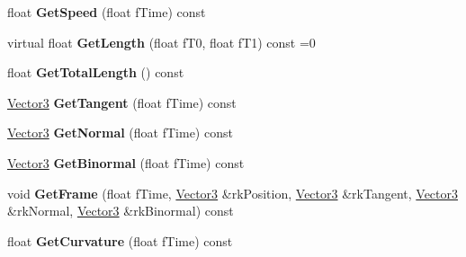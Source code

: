 \begin{DoxyCompactItemize}
\item 
float {\bfseries Get\+Speed} (float f\+Time) const \hypertarget{class_magnum_1_1_curve3_af4ba0fae1e8c996dc435f2b416fe9c7a}{}\label{class_magnum_1_1_curve3_af4ba0fae1e8c996dc435f2b416fe9c7a}

\item 
virtual float {\bfseries Get\+Length} (float f\+T0, float f\+T1) const  =0\hypertarget{class_magnum_1_1_curve3_afe03ce348cdfc71e86739bb19c6f7e57}{}\label{class_magnum_1_1_curve3_afe03ce348cdfc71e86739bb19c6f7e57}

\item 
float {\bfseries Get\+Total\+Length} () const \hypertarget{class_magnum_1_1_curve3_ac59357d48edc8fee6e96362cb49e2346}{}\label{class_magnum_1_1_curve3_ac59357d48edc8fee6e96362cb49e2346}

\item 
\hyperlink{class_magnum_1_1_vector3}{Vector3} {\bfseries Get\+Tangent} (float f\+Time) const \hypertarget{class_magnum_1_1_curve3_ada57700698b9ce31b161416e5b954ca4}{}\label{class_magnum_1_1_curve3_ada57700698b9ce31b161416e5b954ca4}

\item 
\hyperlink{class_magnum_1_1_vector3}{Vector3} {\bfseries Get\+Normal} (float f\+Time) const \hypertarget{class_magnum_1_1_curve3_aa3bcf0990ac54a48fd08c09dedcff489}{}\label{class_magnum_1_1_curve3_aa3bcf0990ac54a48fd08c09dedcff489}

\item 
\hyperlink{class_magnum_1_1_vector3}{Vector3} {\bfseries Get\+Binormal} (float f\+Time) const \hypertarget{class_magnum_1_1_curve3_a8f4ede1777a8e4f059873b6a7147a53f}{}\label{class_magnum_1_1_curve3_a8f4ede1777a8e4f059873b6a7147a53f}

\item 
void {\bfseries Get\+Frame} (float f\+Time, \hyperlink{class_magnum_1_1_vector3}{Vector3} \&rk\+Position, \hyperlink{class_magnum_1_1_vector3}{Vector3} \&rk\+Tangent, \hyperlink{class_magnum_1_1_vector3}{Vector3} \&rk\+Normal, \hyperlink{class_magnum_1_1_vector3}{Vector3} \&rk\+Binormal) const \hypertarget{class_magnum_1_1_curve3_a8e9cfdc7c42989a7423b66a9e416340d}{}\label{class_magnum_1_1_curve3_a8e9cfdc7c42989a7423b66a9e416340d}

\item 
float {\bfseries Get\+Curvature} (float f\+Time) const \hypertarget{class_magnum_1_1_curve3_abd559dbdb10b22981fdb3520a9e5dbc1}{}\label{class_magnum_1_1_curve3_abd559dbdb10b22981fdb3520a9e5dbc1}


\end{DoxyCompactItemize}
